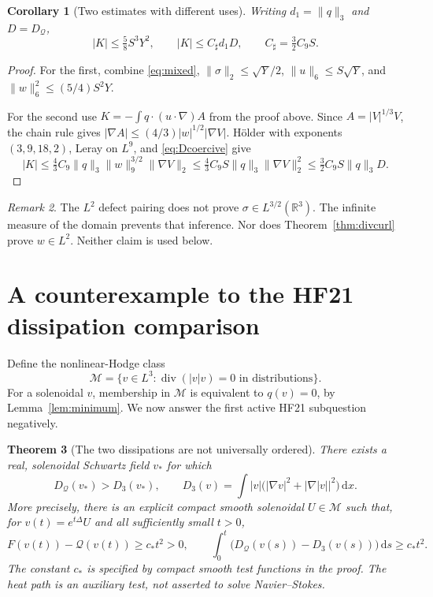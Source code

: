 \documentclass[11pt,a4paper]{article}
\newtheorem{theorem}{Theorem}[section]
\newtheorem{corollary}[theorem]{Corollary}
\theoremstyle{definition}
\theoremstyle{remark}
\newtheorem{remark}[theorem]{Remark}
\newcommand{\R}{\mathbb R}
\newcommand{\Q}{\mathcal Q}
\newcommand{\M}{\mathcal M}
\newcommand{\dd}{\,\mathrm d}
\newcommand{\norm}[1]{\lVert #1\rVert}
\newcommand{\diver}{\operatorname{div}}
\numberwithin{equation}{section}
\begin{document}
\begin{corollary}[Two estimates with different uses]\label{cor:Kbounds}
Writing \(d_1=\norm q_3\) and \(D=D_{\Q}\),
\begin{equation}\label{eq:Kbounds}
|K|\le\tfrac58S^3Y^2,
\qquad
|K|\le C_\sharp d_1D,
\qquad C_\sharp=\tfrac32C_9S.
\end{equation}
\end{corollary}
\begin{proof}
For the first, combine \eqref{eq:mixed}, \(\norm\sigma_2\le\sqrt Y/2\), \(\norm u_6\le S\sqrt Y\), and \(\norm w_6^2\le(5/4)S^2Y\).

For the second use \(K=-\int q\cdot(u\cdot\nabla)A\) from the proof above. Since \(A=|V|^{1/3}V\), the chain rule gives
\(|\nabla A|\le(4/3)|w|^{1/2}|\nabla V|\).
Hölder with exponents \((3,9,18,2)\), Leray on \(L^9\), and \eqref{eq:Dcoercive} give
\[
|K|\le\tfrac43C_9\norm q_3\norm w_9^{3/2}\norm{\nabla V}_2
\le\tfrac43C_9S\norm q_3\norm{\nabla V}_2^2
\le\tfrac32C_9S\norm q_3D.
\]
\end{proof}
\begin{remark}
The \(L^2\) defect pairing does not prove \(\sigma\in L^{3/2}(\R^3)\). The infinite measure of the domain prevents that inference. Nor does Theorem~\ref{thm:divcurl} prove \(w\in L^2\). Neither claim is used below.
\end{remark}

\section{A counterexample to the HF21 dissipation comparison}\label{sec:heatcounter}
Define the nonlinear-Hodge class
\[
\M=\{v\in L^3:\diver(|v|v)=0\text{ in distributions}\}.
\]
For a solenoidal \(v\), membership in \(\M\) is equivalent to \(q(v)=0\), by Lemma~\ref{lem:minimum}. We now answer the first active HF21 subquestion negatively.

\begin{theorem}[The two dissipations are not universally ordered]\label{thm:counter}
There exists a real, solenoidal Schwartz field \(v_*\) for which
\begin{equation}\label{eq:counter}
D_{\Q}(v_*)>D_3(v_*),
\qquad
D_3(v)=\int |v|\bigl(|\nabla v|^2+|\nabla|v||^2\bigr)\dd x.
\end{equation}
More precisely, there is an explicit compact smooth solenoidal \(U\in\M\) such that, for \(v(t)=e^{t\Delta}U\) and all sufficiently small \(t>0\),
\begin{equation}\label{eq:heatgap}
F(v(t))-\Q(v(t))\ge c_*t^2>0,
\qquad
\int_0^t\bigl(D_{\Q}(v(s))-D_3(v(s))\bigr)\dd s\ge c_*t^2.
\end{equation}
The constant \(c_*\) is specified by compact smooth test functions in the proof. The heat path is an auxiliary test, not asserted to solve Navier--Stokes.
\end{theorem}
\end{document}
